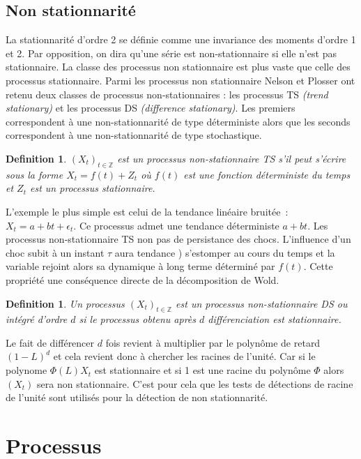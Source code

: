 \documentclass[11pt]{scrartcl} %
\newtheorem{Def}[theorem]{Definition}
\newcommand{\Xt}{\left(X_t\right)_{t\in\mathbb{Z}}}
\begin{document}
\subsection{Non stationnarité}
La stationnarité d'ordre 2 se définie comme une invariance des moments d'ordre 1 et 2. Par opposition, on dira qu'une série est non-stationnaire si elle n'est pas stationnaire. La classe des processus non stationnaire est plus vaste que celle des processus stationnaire. Parmi les processus non stationnaire Nelson et Plosser \cite{NonSta} ont retenu deux classes de processus non-stationnaires : les processus TS \textit{(trend stationary)} et les processus DS \textit{(difference stationary)}. Les premiers correspondent à une non-stationnarité de type déterministe alors que les seconds correspondent à une non-stationnarité de type stochastique.
\begin{Def}
$\Xt$ est un processus non-stationnaire TS s'il peut s'écrire sous la forme $X_t = f(t)+Z_t$ où $f(t)$ est une fonction déterministe du temps et $Z_t$ est un processus stationnaire.
\end{Def}
L'exemple le plus simple est celui de la tendance linéaire bruitée~:~$X_t=a+bt+\epsilon_t$. Ce processus admet une tendance déterministe $a+bt$. Les processus non-stationnaire TS non pas de persistance des chocs. L'influence d'un choc subit à un instant $\tau$ aura tendance ) s'estomper au cours du temps et la variable rejoint alors sa dynamique à long terme déterminé par $f(t)$. Cette propriété une conséquence directe de la décomposition de Wold.
\begin{Def}
Un processus $\Xt$ est un processus non-stationnaire DS ou intégré d'ordre $d$ si le processus obtenu après $d$ différenciation est stationnaire.
\end{Def}
Le fait de différencer $d$ fois revient à multiplier par le polynôme de retard $(1-L)^d$ et cela revient donc à chercher les racines de l'unité. Car si le polynome $\Phi(L)X_t$ est stationnaire et si 1 est une racine du polynôme $\Phi$ alors $\left(X_t\right)$ sera non stationnaire. C'est pour cela que les tests de détections de racine de l'unité sont utilisés pour la détection de non stationnarité.
\section{Processus}
\end{document}
